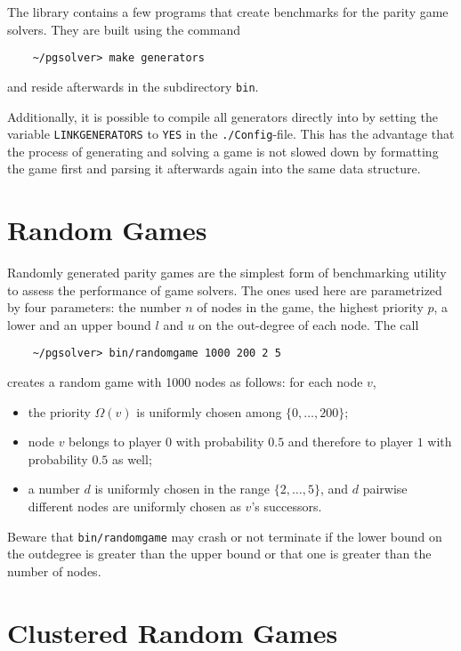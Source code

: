 
The \pgsolver library contains a few programs that create benchmarks for the parity game
solvers. They are built using the command
\begin{verbatim}
    ~/pgsolver> make generators
\end{verbatim}
and reside afterwards in the subdirectory \texttt{bin}.

Additionally, it is possible to compile all generators directly into \pgsolver by setting
the variable \texttt{LINKGENERATORS} to \texttt{YES} in the \texttt{./Config}-file. This
has the advantage that the process of generating and solving a game is not slowed down by
formatting the game first and parsing it afterwards again into the same data structure.

\section{Random Games}

Randomly generated parity games are the simplest form of benchmarking utility to assess the
performance of game solvers. The ones used here are parametrized by four parameters: the number
$n$ of nodes in the game, the highest priority $p$, a lower and an upper bound $l$ and $u$ on the
out-degree of each node. The call
\begin{verbatim}
    ~/pgsolver> bin/randomgame 1000 200 2 5
\end{verbatim}
creates a random game with 1000 nodes as follows: for each node $v$,
\begin{itemize}
\item the priority $\Omega(v)$ is uniformly chosen among $\{0,\ldots,200\}$;
\item node $v$ belongs to player $0$ with probability $0.5$ and therefore to player $1$ with
      probability $0.5$ as well;
\item a number $d$ is uniformly chosen in the range $\{2,\ldots,5\}$, and $d$ pairwise different
      nodes are uniformly chosen as $v$'s successors.
\end{itemize}
Beware that \texttt{bin/randomgame} may crash or not terminate if the lower bound on the outdegree
is greater than the upper bound or that one is greater than the number of nodes.


\section{Clustered Random Games}

